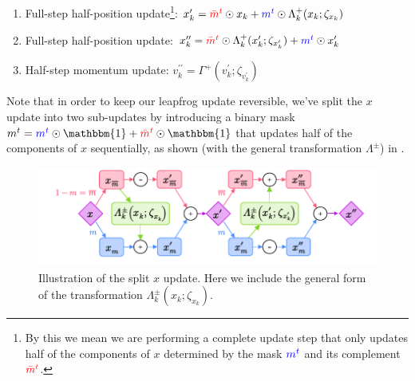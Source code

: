 \documentclass{article} %
\newcommand{\mbart}{\textcolor{red}{\bar{m}^{t}}}
\newcommand{\mt}{\textcolor{blue}{m^{t}}}
\begin{document}
{\begin{enumerate}
   \)
   \item Full-step half-position update\footnote{By this we mean we are performing a complete update step that only
      updates half of the components of \(x\) determined by the mask \(\mt\) and its complement \(\mbart\).}:
      \hspace{17pt} \(%
         x^{\prime}_{k} = \mbart\odot x_{k} + \mt\odot \Lambda^{+}_{k}(x_{k};\zeta_{x_{k}})
   \)
   \item Full-step half-position update:%
      \hspace{20pt} \(%
         x^{\prime\prime}_{k} = \mbart\odot\Lambda^{+}_{k}(x^{\prime}_{k};\zeta_{x^{\prime}_{k}}) + \mt\odot x^{\prime}_{k}
   \)
   \item Half-step momentum update:%
      \hspace{24pt} \(%
         v^{\prime\prime}_{k} = \Gamma^{+}(v^{\prime}_{k}; \zeta_{v^{\prime}_{k}})
   \)
\end{enumerate}
%
Note that in order to keep our leapfrog update reversible, we've split the \(x\) update into two sub-updates by
introducing a binary mask \(m^{t} = \mt\odot\mathbbm{1} + \mbart\odot\mathbbm{1}\) that updates half of the components
of \(x\) sequentially, as shown (with the general transformation \(\Lambda^{\pm}\)) in .
%
\begin{figure}[htpb]
   \centering
   \includegraphics[width=\textwidth]{figures/splitx10.pdf}
   \caption{\label{fig:splitx}Illustration of the split \(x\) update. Here we include the general form of the
   transformation \(\Lambda^{\pm}_{k}(x_{k};\zeta_{x_{k}})\).}
\end{figure}
%

}
\end{document}

